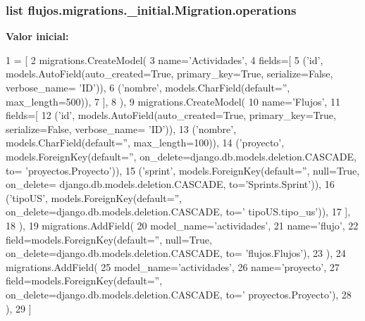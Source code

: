 \subsubsection[{\texorpdfstring{operations}{operations}}]{\setlength{\rightskip}{0pt plus 5cm}list flujos.\+migrations.\+\_\+initial.\+Migration.\+operations\hspace{0.3cm}{\ttfamily [static]}}\hypertarget{classflujos_1_1migrations_1_10001__initial_1_1_migration_a551e85de7746f53ce793e05a1925a165}{}\label{classflujos_1_1migrations_1_10001__initial_1_1_migration_a551e85de7746f53ce793e05a1925a165}
{\bfseries Valor inicial\+:}
\begin{DoxyCode}
1 = [
2         migrations.CreateModel(
3             name=\textcolor{stringliteral}{'Actividades'},
4             fields=[
5                 (\textcolor{stringliteral}{'id'}, models.AutoField(auto\_created=\textcolor{keyword}{True}, primary\_key=\textcolor{keyword}{True}, serialize=\textcolor{keyword}{False}, verbose\_name=\textcolor{stringliteral}{
      'ID'})),
6                 (\textcolor{stringliteral}{'nombre'}, models.CharField(default=\textcolor{stringliteral}{''}, max\_length=500)),
7             ],
8         ),
9         migrations.CreateModel(
10             name=\textcolor{stringliteral}{'Flujos'},
11             fields=[
12                 (\textcolor{stringliteral}{'id'}, models.AutoField(auto\_created=\textcolor{keyword}{True}, primary\_key=\textcolor{keyword}{True}, serialize=\textcolor{keyword}{False}, verbose\_name=\textcolor{stringliteral}{
      'ID'})),
13                 (\textcolor{stringliteral}{'nombre'}, models.CharField(default=\textcolor{stringliteral}{''}, max\_length=100)),
14                 (\textcolor{stringliteral}{'proyecto'}, models.ForeignKey(default=\textcolor{stringliteral}{''}, on\_delete=django.db.models.deletion.CASCADE, to=\textcolor{stringliteral}{
      'proyectos.Proyecto'})),
15                 (\textcolor{stringliteral}{'sprint'}, models.ForeignKey(default=\textcolor{stringliteral}{''}, null=\textcolor{keyword}{True}, on\_delete=
      django.db.models.deletion.CASCADE, to=\textcolor{stringliteral}{'Sprints.Sprint'})),
16                 (\textcolor{stringliteral}{'tipoUS'}, models.ForeignKey(default=\textcolor{stringliteral}{''}, on\_delete=django.db.models.deletion.CASCADE, to=\textcolor{stringliteral}{'
      tipoUS.tipo\_us'})),
17             ],
18         ),
19         migrations.AddField(
20             model\_name=\textcolor{stringliteral}{'actividades'},
21             name=\textcolor{stringliteral}{'flujo'},
22             field=models.ForeignKey(default=\textcolor{stringliteral}{''}, null=\textcolor{keyword}{True}, on\_delete=django.db.models.deletion.CASCADE, to=\textcolor{stringliteral}{
      'flujos.Flujos'}),
23         ),
24         migrations.AddField(
25             model\_name=\textcolor{stringliteral}{'actividades'},
26             name=\textcolor{stringliteral}{'proyecto'},
27             field=models.ForeignKey(default=\textcolor{stringliteral}{''}, on\_delete=django.db.models.deletion.CASCADE, to=\textcolor{stringliteral}{'
      proyectos.Proyecto'}),
28         ),
29     ]
\end{DoxyCode}


